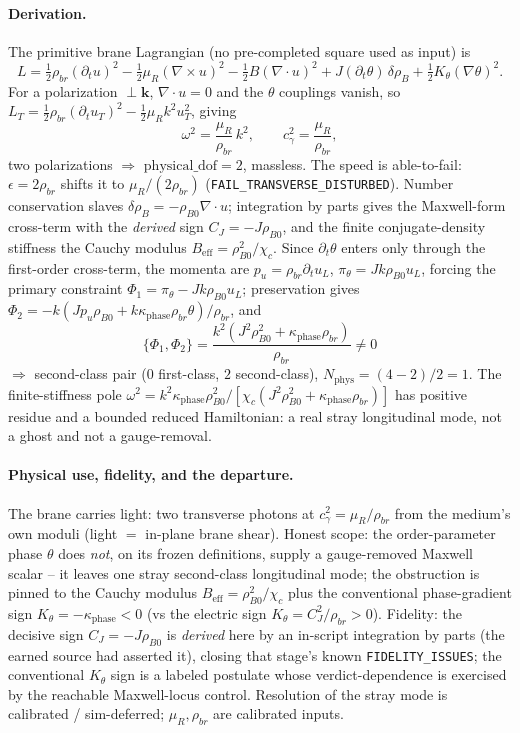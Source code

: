 \paragraph{Derivation.}
The primitive brane Lagrangian (no pre-completed square used as input) is
\[
  L=\tfrac12\rho_{br}(\partial_t u)^2-\tfrac12\mu_R(\nabla\times u)^2
    -\tfrac12 B(\nabla\!\cdot\!u)^2+J(\partial_t\theta)\,\delta\rho_B
    +\tfrac12 K_\theta(\nabla\theta)^2 .
\]
 For a polarization \(\perp\mathbf k\),
\(\nabla\!\cdot\!u=0\) and the \(\theta\) couplings vanish, so
\(L_T=\tfrac12\rho_{br}(\partial_t u_T)^2-\tfrac12\mu_R k^2u_T^2\), giving
\[
  \omega^2=\frac{\mu_R}{\rho_{br}}\,k^2,\qquad
  c_\gamma^2=\frac{\mu_R}{\rho_{br}},
\]
two polarizations \(\Rightarrow\) \(\mathrm{physical\_dof}=2\), massless. The
speed is able-to-fail: \(\epsilon=2\rho_{br}\) shifts it to \(\mu_R/(2\rho_{br})\)
(\texttt{FAIL\_TRANSVERSE\_DISTURBED}).
 Number conservation slaves
\(\delta\rho_B=-\rho_{B0}\nabla\!\cdot\!u\); integration by parts gives the
Maxwell-form cross-term with the \emph{derived} sign \(C_J=-J\rho_{B0}\), and the
finite conjugate-density stiffness the Cauchy modulus
\(B_{\mathrm{eff}}=\rho_{B0}^2/\chi_c\). Since \(\partial_t\theta\) enters only
through the first-order cross-term, the momenta are
\(p_u=\rho_{br}\partial_t u_L\), \(\pi_\theta=Jk\rho_{B0}u_L\), forcing the
primary constraint \(\Phi_1=\pi_\theta-Jk\rho_{B0}u_L\); preservation gives
\(\Phi_2=-k(Jp_u\rho_{B0}+k\kappa_{\mathrm{phase}}\rho_{br}\theta)/\rho_{br}\), and
\[
  \{\Phi_1,\Phi_2\}=\frac{k^2(J^2\rho_{B0}^2+\kappa_{\mathrm{phase}}\rho_{br})}{\rho_{br}}\neq0
\]
\(\Rightarrow\) second-class pair (\(0\) first-class, \(2\) second-class),
\(N_{\mathrm{phys}}=(4-2)/2=1\). The finite-stiffness pole
\(\omega^2=k^2\kappa_{\mathrm{phase}}\rho_{B0}^2/[\chi_c(J^2\rho_{B0}^2+\kappa_{\mathrm{phase}}\rho_{br})]\)
has positive residue and a bounded reduced Hamiltonian: a real stray longitudinal
mode, not a ghost and not a gauge-removal.

\paragraph{Physical use, fidelity, and the departure.}
The brane carries light: two transverse photons at \(c_\gamma^2=\mu_R/\rho_{br}\)
from the medium's own moduli (light \(=\) in-plane brane shear). Honest scope: the
order-parameter phase \(\theta\) does \emph{not}, on its frozen definitions,
supply a gauge-removed Maxwell scalar -- it leaves one stray second-class
longitudinal mode; the obstruction is pinned to the Cauchy modulus
\(B_{\mathrm{eff}}=\rho_{B0}^2/\chi_c\) plus the conventional phase-gradient sign
\(K_\theta=-\kappa_{\mathrm{phase}}<0\) (vs the electric sign
\(K_\theta=C_J^2/\rho_{br}>0\)). Fidelity: the decisive sign \(C_J=-J\rho_{B0}\)
is \emph{derived} here by an in-script integration by parts (the earned source
had asserted it), closing that stage's known \texttt{FIDELITY\_ISSUES}; the
conventional \(K_\theta\) sign is a labeled postulate whose verdict-dependence is
exercised by the reachable Maxwell-locus control. Resolution of the stray mode is
calibrated / sim-deferred; \(\mu_R,\rho_{br}\) are calibrated inputs.
